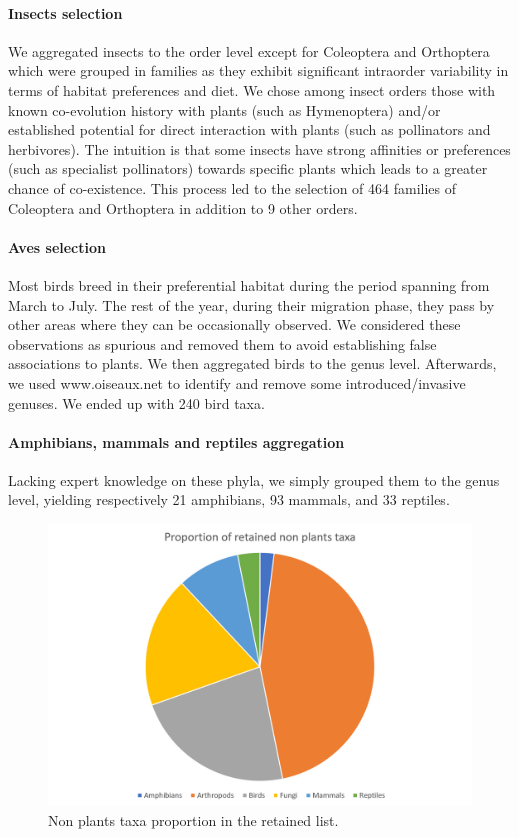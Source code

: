 \documentclass[]{article}
\begin{document}
\paragraph{Insects selection} 
We aggregated insects to the order level except for Coleoptera and Orthoptera which were grouped in families as they exhibit significant intraorder variability in terms of habitat preferences and diet. We chose among insect orders those with known co-evolution history with plants (such as Hymenoptera) and/or established potential for direct interaction with plants (such as pollinators and herbivores)\cite{sauvion2013interactions}. The intuition is that some insects have strong affinities or preferences (such as specialist pollinators) towards specific plants which leads to a greater chance of co-existence. This process led to the selection of 464 families of Coleoptera and Orthoptera in addition to 9 other orders.  

\paragraph{Aves selection}
Most birds breed in their preferential habitat during the period spanning from March to July. The rest of the year, during their migration phase, they pass by other areas where they can be occasionally observed. We considered these observations as spurious and removed them to avoid establishing false associations to plants. We then aggregated birds to the genus level. Afterwards, we used www.oiseaux.net to identify and remove some introduced/invasive genuses.  We ended up with 240 bird taxa. 

\paragraph{Amphibians, mammals and reptiles aggregation} 
Lacking expert knowledge on these phyla, we simply grouped them to the genus level, yielding respectively 21 amphibians, 93 mammals, and 33 reptiles.

\begin{figure}[h]
	\centering
	\includegraphics[scale=0.5]{proportion}
	\caption{Non plants taxa proportion in the retained list.}
	\label{proponp}
\end{figure}
\end{document}
